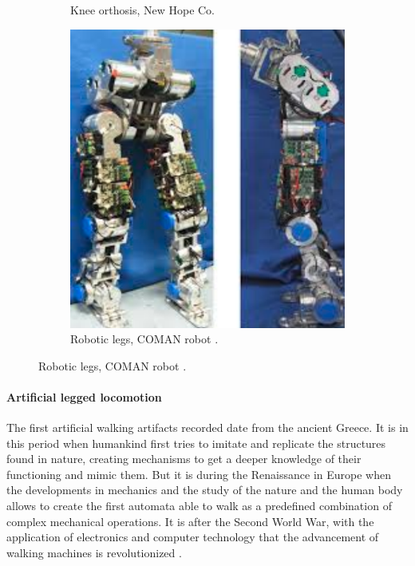 \begin{figure}[htb]
\begin{subfigure}[b]{0.3\textwidth}
        \caption{Knee orthosis, New Hope Co.}
        \label{fig:orthotic_leg}
    \end{subfigure}
    \centering
    \begin{subfigure}[b]{0.3\textwidth}
        \includegraphics[width=\textwidth]{figures/robotic_leg.pdf}
        \caption{Robotic legs, COMAN robot \cite{coman}.}
        \label{fig:robotic_leg}
    \end{subfigure}
\end{figure}

\paragraph{Artificial legged locomotion} %
\label{par:humanoid_robots}  
The first artificial walking artifacts recorded date from the ancient Greece.
It is in this period when humankind first tries to imitate and replicate the structures found in nature, creating mechanisms to get a deeper knowledge of their functioning and mimic them.
But it is during the Renaissance in Europe when the developments in mechanics and the study of the nature and the human body allows to create the first automata able to walk as a predefined combination of complex mechanical operations.
It is after the Second World War, with the application of electronics and computer technology that the advancement of walking machines is revolutionized \cite{legged_mot_history1}.

